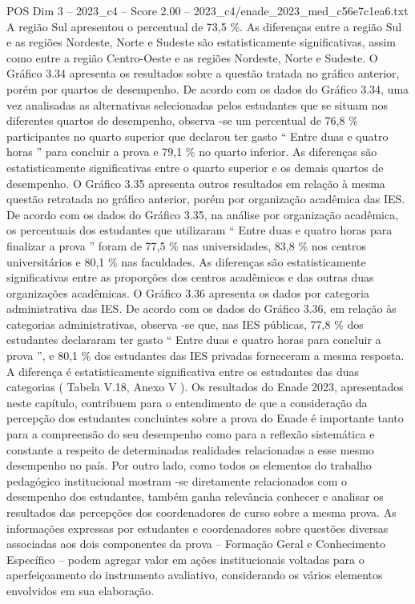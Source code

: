 \begin{textsample}{POS Dim 3 – 2023\_c4 – Score 2.00 – 2023\_c4/enade\_2023\_med\_c56e7c1ea6.txt}
A região Sul apresentou o percentual de 73,5 \%.
As diferenças entre a região Sul e as regiões Nordeste, Norte e Sudeste são estatisticamente significativas, assim como entre a região Centro-Oeste e as regiões Nordeste, Norte e Sudeste.
O Gráfico 3.34 apresenta os resultados sobre a questão tratada no gráfico anterior, porém por quartos de desempenho.
De acordo com os dados do Gráfico 3.34, uma vez analisadas as alternativas selecionadas pelos estudantes que se situam nos diferentes quartos de desempenho, observa -se um percentual de 76,8 \% participantes no quarto superior que declarou ter gasto “ Entre duas e quatro horas ” para concluir a prova e 79,1 \% no quarto inferior.
As diferenças são estatisticamente significativas entre o quarto superior e os demais quartos de desempenho.
O Gráfico 3.35 apresenta outros resultados em relação à mesma questão retratada no gráfico anterior, porém por organização acadêmica das IES.
De acordo com os dados do Gráfico 3.35, na análise por organização acadêmica, os percentuais dos estudantes que utilizaram “ Entre duas e quatro horas para finalizar a prova ” foram de 77,5 \% nas universidades, 83,8 \% nos centros universitários e 80,1 \% nas faculdades.
As diferenças são estatisticamente significativas entre as proporções dos centros acadêmicos e das outras duas organizações acadêmicas.
O Gráfico 3.36 apresenta os dados por categoria administrativa das IES.
De acordo com os dados do Gráfico 3.36, em relação às categorias administrativas, observa -se que, nas IES públicas, 77,8 \% dos estudantes declararam ter gasto “ Entre duas e quatro horas para concluir a prova ”, e 80,1 \% dos estudantes das IES privadas forneceram a mesma resposta.
A diferença é estatisticamente significativa entre os estudantes das duas categorias ( Tabela V.18, Anexo V ).
Os resultados do Enade 2023, apresentados neste capítulo, contribuem para o entendimento de que a consideração da percepção dos estudantes concluintes sobre a prova do Enade é importante tanto para a compreensão do seu desempenho como para a reflexão sistemática e constante a respeito de determinadas realidades relacionadas a esse mesmo desempenho no país.
Por outro lado, como todos os elementos do trabalho pedagógico institucional mostram -se diretamente relacionados com o desempenho dos estudantes, também ganha relevância conhecer e analisar os resultados das percepções dos coordenadores de curso sobre a mesma prova.
As informações expressas por estudantes e coordenadores sobre questões diversas associadas aos dois componentes da prova – Formação Geral e Conhecimento Específico – podem agregar valor em ações institucionais voltadas para o aperfeiçoamento do instrumento avaliativo, considerando os vários elementos envolvidos em sua elaboração.

\end{textsample}

